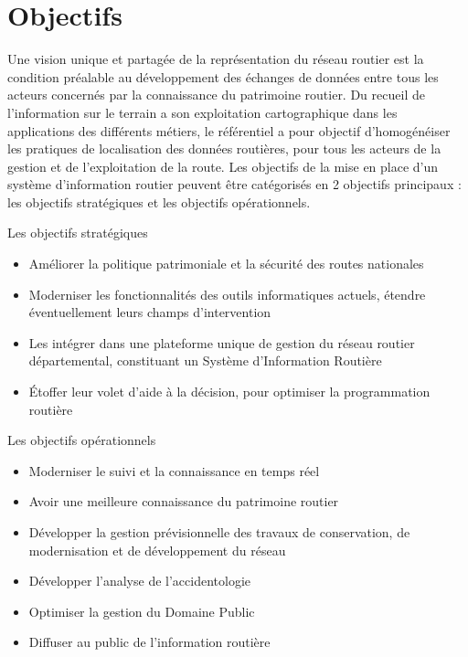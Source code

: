 \chapter{Objectifs}

\ifpdf
    \graphicspath{{Chapter3/Figs/Raster/}{Chapter3/Figs/PDF/}{Chapter3/Figs/}}
\else
    \graphicspath{{Chapter3/Figs/Vector/}{Chapter3/Figs/}}
\fi

Une vision unique et partagée de la représentation du réseau routier est la condition préalable au développement des échanges de données entre tous les acteurs concernés par la connaissance du patrimoine routier.
Du recueil de l’information sur le terrain a son exploitation cartographique dans les applications des différents métiers, le référentiel a pour objectif d’homogénéiser les pratiques de localisation des données routières, pour tous les acteurs de la gestion et de l’exploitation de la route.
Les objectifs de la mise en place d’un système d’information routier peuvent être catégorisés en 2 objectifs principaux : les objectifs stratégiques et les objectifs opérationnels.



Les objectifs stratégiques
\begin{itemize}
\item Améliorer la politique patrimoniale et la sécurité des routes nationales
\item Moderniser les fonctionnalités des outils informatiques actuels, étendre éventuellement leurs champs d'intervention
\item Les intégrer dans une plateforme unique de gestion du réseau routier départemental, constituant un Système d'Information Routière
\item Étoffer leur volet d'aide à la décision, pour optimiser la programmation routière
\end{itemize}



Les objectifs opérationnels
\begin{itemize}
\item Moderniser le suivi et la connaissance en temps réel  
\item Avoir une meilleure connaissance du patrimoine routier 
\item Développer la gestion prévisionnelle des travaux de conservation, de modernisation et de développement du réseau 
\item Développer l’analyse de l’accidentologie
\item Optimiser la gestion du Domaine Public
\item Diffuser au public de l'information routière
\end{itemize}